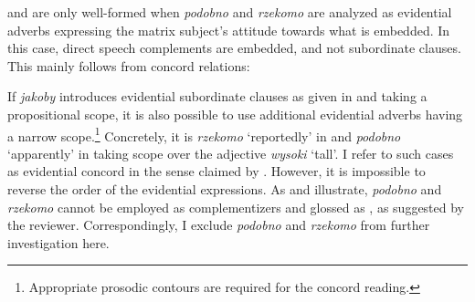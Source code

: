 \documentclass[output=paper]{langsci/langscibook}
\begin{document}
\ea {}
          \z\z
{} and  are only well-formed when \emph{podobno} and \emph{rzekomo} are analyzed as evidential adverbs expressing the matrix subject's attitude towards what is embedded. In this case, direct speech complements are embedded, and not subordinate clauses.  This mainly follows from concord relations:

\ea {}
\z\z
If \emph{jakoby} introduces evidential subordinate clauses as given in  and  taking a propositional scope, it is also possible to use additional evidential adverbs having a narrow scope.\footnote{Appropriate prosodic contours are required for the concord reading.
}
Concretely, it is \emph{rzekomo}  `reportedly' in  and \emph{podobno} `apparently' in  taking scope over the adjective \emph{wysoki} `tall'. I refer to such cases as evidential concord in the sense claimed by \textcite{Schenner2007}. However, it is impossible to reverse the order of the evidential expressions. As  and  illustrate, \emph{podobno} and \emph{rzekomo} cannot be employed as complementizers and glossed as {\comp}, as suggested by the reviewer. Correspondingly, I exclude \emph{podobno} and \emph{rzekomo} from further investigation here.
\end{document}
